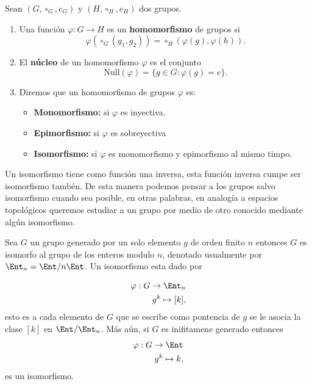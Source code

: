 \begin{df}
Sean $(G,\circ_G,e_G)$ y $(H,\circ_H,e_H)$ dos grupos. 

\begin{enumerate}
	\item Una función $\varphi:G \to H$ es un \textbf{homomorfismo} de grupos si $$\varphi(\circ_G(g_1,g_2))=\circ_H(\varphi(g), \varphi(h)).$$
	
	\item El \textbf{núcleo} de un homomorfismo $\varphi$ es el  conjunto $$\mathrm{Null}(\varphi)=\{ g \in G: \varphi(g)=e\}.$$
	
	\item Diremos que un homomorfismo de grupos $\varphi$ es:
	\begin{itemize}
    		\item \textbf{Monomorfismo:} si $\varphi$ es inyectiva.
    		\item \textbf{Epimorfismo:} si $\varphi$ es sobreyectiva
		\item \textbf{Isomorfismo:} si $\varphi$ es monomorfismo y epimorfismo al mismo timpo. 
    	\end{itemize}
\end{enumerate}				
\end{df}
Un isomorfismo tiene como función una inversa, esta función inversa  cumpe ser isomorfismo tambén. De esta manera podemos pensar a los grupos salvo isomorfismo cuando sea posible, en otras palabras, en analogía a espacios topológicos queremos estudiar a un grupo por medio de otro conocido mediante algún isomorfismo. 

\begin{ej}
Sea $G$ un grupo generado por un solo elemento $g$ de orden finito $n$ entonces $G$ es isomorfo al grupo de los enteros modulo $n$, denotado usualmente por $\Ent_n = \Ent/n \Ent$. Un isomorfismo esta dado por

\begin{align*}
\varphi:G \to \Ent_n \\
g^k \mapsto [k],
\end{align*}
esto es a cada elemento de $G$ que se escribe como pontencia de  $g$ se le asocia la clase $[k]$ en $\Ent/\Ent_n$. Más aún, si $G$ es inifitamene generado entonces 
\begin{align*}
\varphi:G \to \Ent \\
g^k \mapsto k,
\end{align*}
es un isomorfismo.
\end{ej}

